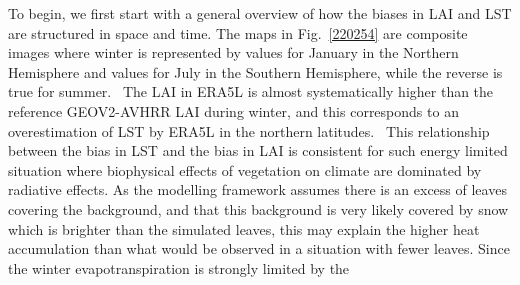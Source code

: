 \documentclass[gmd, manuscript]{copernicus}
\begin{document}
To begin, we first start with a general overview of how the biases in
LAI and LST are structured in space and time. The maps in
Fig.~{\ref{220254}} are composite images where winter
is represented by values for January in the Northern Hemisphere and
values for July in the Southern Hemisphere, while the reverse is true
for summer.~ The LAI in ERA5L is almost systematically higher than the
reference GEOV2-AVHRR LAI during winter, and this corresponds to an
overestimation of LST by ERA5L in the northern latitudes.~ This
relationship between the bias in LST and the bias in LAI is consistent
for such energy limited situation where biophysical effects of
vegetation on climate are dominated by radiative effects. As the
modelling framework assumes there is an excess of leaves covering the
background, and that this background is very likely covered by snow which is 
brighter than the simulated leaves, this may explain the higher
heat accumulation than what would be observed in a situation with fewer
leaves. Since the winter evapotranspiration is strongly limited by the
\end{document}
